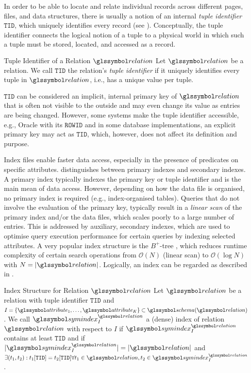In order to be able to locate and relate individual records across different pages, files, and data structures, there is usually a notion of an internal \emph{tuple identifier} $\mathtt{TID}$, which uniquely identifies every record (see ). Conceptually, the tuple identifier connects the logical notion of a tuple to a physical world in which such a tuple must be stored, located, and accessed as a record.

\begin{definition}[label=definition:tuple_identifier]{Tuple Identifier of a Relation $\relation$}{}
    Let $\relation$ be a relation. We call $\mathtt{TID}$ the relation's \emph{tuple identifier} if it uniquely identifies every tuple in $\relation$, i.e., has a unique value per tuple.
\end{definition}

$\mathtt{TID}$ can be considered an implicit, internal primary key of $\relation$ that is often not visible to the outside and may even change its value as entries are being changed. However, some systems make the tuple identifier accessible, e.g., Oracle with its $\mathtt{ROWID}$ and in some database implementations, an explicit primary key may act as $\mathtt{TID}$, which, however, does not affect its definition and purpose.

Index files enable faster data access, especially in the presence of predicates on specific attributes. \cite{Petrov:2019Database} distinguishes between primary indexes and secondary indexes. A primary index typically indexes the primary key or tuple identifier and is the main mean of data access. However, depending on how the data file is organised, no primary index is required (e.g., index-organised tables). Queries that do not involve the evaluation of the primary key, typically result in a \emph{linear scan} of the primary index and/or the data files, which scales poorly to a large number of entries. This is addressed by auxiliary, secondary indexes, which are used to optimise query execution performance for certain queries by indexing selected attributes. A very popular index structure is the $B^{+}$-tree \cite{Bayer:2002Organization}, which reduces runtime complexity of certain search operations from $\mathcal{O}(N)$ (linear scan) to $\mathcal{O}(\log N)$ with $N = |\relation|$. Logically, an index can be regarded as described in .

\begin{definition}[label=definition:index]{Index Structure for Relation $\relation$}{}
    Let $\relation$ be a relation with tuple identifier $\mathtt{TID}$ and $I = \{ \attribute_{1}, \ldots, \attribute_{K} \} \subset \schema (\relation)$. We call $\symindex^{\relation}_I$ a (dense) index of relation $\relation$ with respect to $I$ if $\symindex^{\relation}_I$ contains at least $\mathtt{TID}$ and if $|\symindex^{\relation}_I| = |\relation|$ and $\exists (t_1, t_2) : t_1[\mathtt{TID}] = t_2[\mathtt{TID}] \forall t_1 \in \relation, t_2 \in \symindex^{\relation}_I$.
\end{definition}

